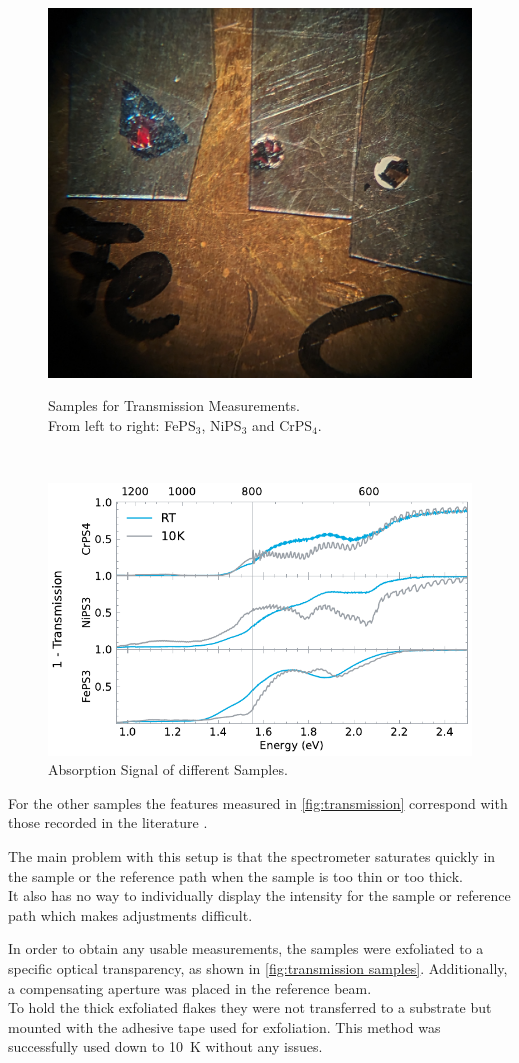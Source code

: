 \documentclass[
	oneside,
	parskip=half,
	a4paper,
]{scrbook}
\begin{document}
\begin{figure}
	\includegraphics[width=.3\textwidth]{../../photos/transmission samples.jpg}
	\caption\\
	{Samples for Transmission Measurements.\\
	From left to right: FePS$_3$, NiPS$_3$ and CrPS$_4$.}
	\label{fig:transmission samples}
\end{figure}
\begin{figure}
	\centering
	\includegraphics{../figures/2024-03-15 Absorbance.pdf}
	\caption{Absorption Signal of different Samples.}
	\label{fig:transmission}
\end{figure}
For the other samples the features measured in \autoref{fig:transmission} correspond with those recorded in the literature \cite{CrPS4_transmission, NiPS3_transmission, FePS3_transmission}.

The main problem with this setup is that the spectrometer saturates quickly in the sample or the reference path when the sample is too thin or too thick.\\
It also has no way to individually display the intensity for the sample or reference path which makes adjustments difficult.

In order to obtain any usable measurements, the samples were exfoliated to a specific optical transparency, as shown in \autoref{fig:transmission samples}.
Additionally, a compensating aperture was placed in the reference beam.\\
To hold the thick exfoliated flakes they were not transferred to a substrate but mounted with the adhesive tape used for exfoliation. 
This method was successfully used down to \SI{10}{K} without any issues.
\end{document}

